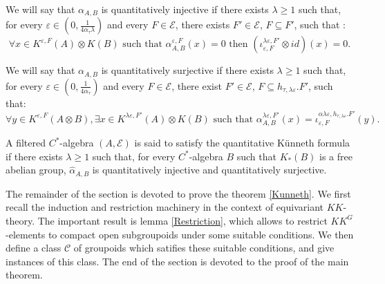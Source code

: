 We will say that $\alpha_{A,B}$ is quantitatively injective if there exists $\lambda \geq 1$ such that, for every $\varepsilon\in (0,\frac{1}{4\alpha_\tau \lambda})$ and every $F\in\mathcal E$, there exists $F'\in\mathcal E$, $F\subseteq F'$, such that : 
\[\forall x\in K^{\varepsilon,F}(A)\otimes K(B)\text{ such that }\alpha_{A,B}^{\varepsilon,F}(x)=0 \text{ then }(\iota_{\varepsilon,F}^{\lambda\varepsilon,F'}\otimes id) (x) = 0.\] 

We will say that $\alpha_{A,B}$ is quantitatively surjective if there exists $\lambda \geq 1$ such that, for every $\varepsilon \in (0,\frac{1}{4\alpha_\tau})$ and every $F\in\mathcal E$, there exist $F'\in\mathcal E$, $F\subseteq h_{\tau,\lambda\varepsilon}.F'$, such that:
\[ \forall y\in K^{\varepsilon,F}(A\otimes B), \exists x\in K^{\lambda\varepsilon, F'}(A)\otimes K(B) \text{ such that }
\alpha^{\lambda\varepsilon,F'}_{A,B}(x)=\iota_{\varepsilon,F}^{\alpha\lambda\varepsilon,h_{\tau, \lambda\varepsilon}.F'}(y).\] 


\begin{definition}
A filtered $C^*$-algebra $(A,\mathcal E)$ is said to satisfy the quantitative Künneth formula if there exists $\lambda \geq 1$ such that, for every $C^*$-algebra $B$ such that $K_*(B)$ is a free abelian group, $\hat\alpha_{A,B}$ is quantitatively injective and quantitatively surjective. 
\end{definition}

The remainder of the section is devoted to prove the theorem \ref{Kunneth}. We first recall the induction and restriction machinery in the context of equivariant $KK$-theory. The important result is lemma \ref{Restriction}, which allows to restrict $KK^G$-elements to compact open subgroupoids under some suitable conditions. We then define a class $\mathcal C$ of groupoids which satifies these suitable conditions, and give instances of this class. The end of the section is devoted to the proof of the main theorem.




